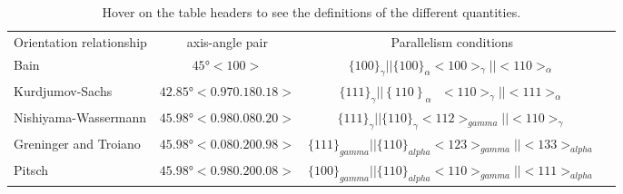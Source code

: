 
\begin{table*}
\caption{Hover on the table headers to see the definitions of the  different quantities.}
\label{table}
\begin{tabular}{l c | c c }
\hline\hline
    Orientation relationship & axis-angle pair & Parallelism conditions \\
    Bain \cite{bain1924nature} & \(45°<100>\) & $\{100\}_{\gamma} || \{100\}_{\alpha} <100>_{\gamma } || <110>_{\alpha}$ \\
    Kurdjumov-Sachs \cite{kurdjumow1930mechanismus} & \(42.85°<0.970.180.18>\) & $\{111\}_{\gamma}||\left\{110\right\}_{\alpha}\ \ \ <110>_{\gamma}||<111>_{\alpha}$ \\
    Nishiyama-Wassermann\cite{nishiyama1934x,wassermann1935ueber} & $45.98° <0.98 0.08 0.20>$ & $\{111\}_{\gamma} || \{110\}_{\gamma} <112>_{gamma} || <110>_{\gamma}$ \\
    Greninger and Troiano\cite{greninger1949mechanism} & $45.98° <0.08 0.20 0.98>$ & $\{111\}_{gamma} || \{110\}_{alpha} <123>_{gamma} || <133>_{alpha}$ \\
    Pitsch\cite{pitsch1962orientierungszusammenhang} & $45.98° <0.98 0.20 0.08>$ & $\{100\}_{gamma} || \{110\}_{alpha} <110>_{gamma} || <111>_{alpha}$ \\
\hline
\end{tabular}
\end{table*}
